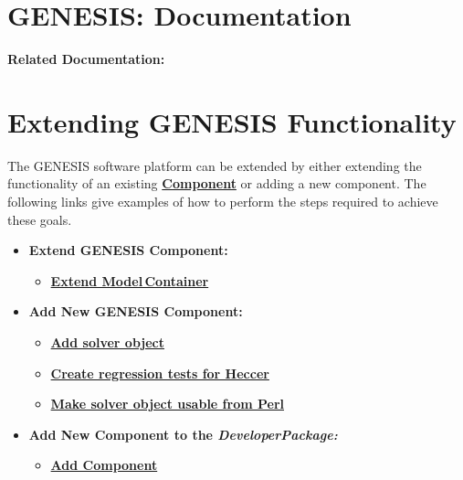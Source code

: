 \documentclass[12pt]{article}
\begin{document}
\section*{GENESIS: Documentation}

{\bf Related Documentation:}

\section*{Extending GENESIS Functionality}

The GENESIS software platform can be extended by either extending the functionality of an existing \href{../reserved-words/reserved-words.tex}{\bf Component} or adding a new component. The following links give examples of how to perform the steps required to achieve these goals.

\begin{itemize}
   \item[]{\bf Extend GENESIS Component:}
      \begin{itemize}
         \item[]\href{../genesis-extend-model-container/genesis-extend-model-container.tex}{\bf Extend Model\,Container}
      \end{itemize}
      
   \item[]{\bf Add New GENESIS Component:}
      \begin{itemize}
         \item[]\href{../genesis-add-object-solver/genesis-add-object-solver.tex}{\bf Add solver object}
         \item[]\href{../genesis-create-test-heccer/genesis-create-test-heccer.tex}{\bf Create regression tests for Heccer}
         \item[]\href{../genesis-add-swigbinding-heccer/genesis-add-swigbinding-heccer.tex}{\bf Make solver object usable from Perl}
      \end{itemize}
      
   \item[]{\bf Add New Component to the {\it DeveloperPackage:}}
      \begin{itemize}
         \item[]\href{../genesis-addto-component-developerpackage/genesis-addto-component-developerpackage.tex}{\bf Add Component}
      \end{itemize} 
\end{itemize}
\end{document}
